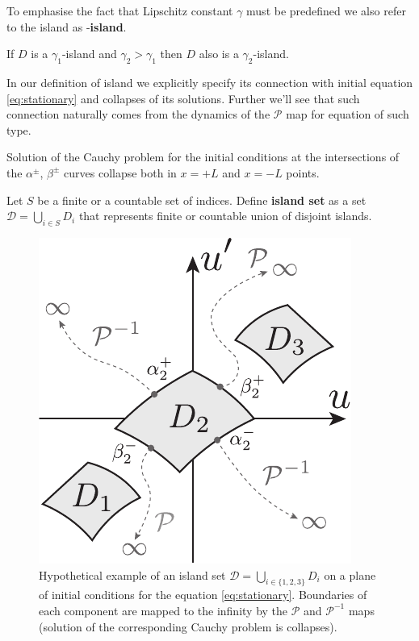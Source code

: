 To emphasise the fact that Lipschitz constant $\gamma$ must be predefined we also refer to the island as \bm{$\gamma$}-{\bf island}.

\begin{remark}
	If $D$ is a $\gamma_1$-island and $\gamma_2 > \gamma_1$	then $D$ also is a $\gamma_2$-island.
\end{remark}

In our definition of island we explicitly specify its connection with initial equation \eqref{eq:stationary} and collapses of its solutions.
Further we'll see that such connection naturally comes from the dynamics of the $\mathcal{P}$ map for equation of such type.

\begin{remark}
	Solution of the Cauchy problem for the initial conditions at the  intersections of the $\alpha^{\pm}$, $\beta^{\pm}$ curves collapse both in $x = +L$ and $x = -L$ points.
\end{remark}

\begin{definition}
	Let $S$ be a finite or a countable set of indices.
	Define {\bf island set} as a set $\mathcal{D} = \bigcup_{i \in S} D_i$ that represents finite or countable union of disjoint islands.
\end{definition}

\begin{figure}[h]
\centering
	\includegraphics[scale = 1]{pic/islands set}
	\caption{Hypothetical example of an island set $\mathcal{D} = \bigcup_{i \in \{1, 2, 3\}} D_i$ on a plane of initial conditions for the equation \eqref{eq:stationary}. Boundaries of each component are mapped to the infinity by the $\mathcal{P}$ and $\mathcal{P}^{-1}$ maps (solution of the corresponding Cauchy problem is collapses).}
\label{fig:islands-set}
\end{figure}

